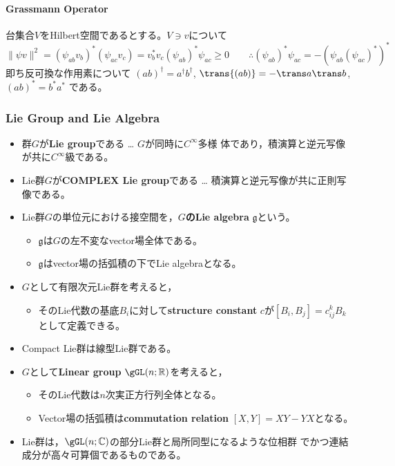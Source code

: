 \paragraph{Grassmann Operator}\mbox{}\par
台集合$V$をHilbert空間であるとする。$V\ni v$について
\begin{equation}
 \|\psi v\|^2=(\psi_{ab}v_b)^*(\psi_{ac}v_c) = v_b^*v_c(\psi_{ab})^*\psi_{ac}\ge 0
\qquad\therefore
(\psi_{ab})^*\psi_{ac}
 = -\left(\psi_{ab}(\psi_{ac})^*\right)^*
\end{equation}
即ち反可換な作用素について
$(ab)^\dagger = a^\dagger b^\dagger$,
$\trans{(ab)} = -\trans a \trans b$,
$(ab)^* = b^*a^*$ である。



\subsubsection{Lie Group and Lie Algebra}
\begin{itemize}
 \item 群$G$が{\bf Lie group}である … $G$が同時に$C^\infty$多様
       体であり，積演算と逆元写像が共に$C^\infty$級である。
 \item Lie群$G$が{\bf COMPLEX Lie group}である … 積演算と逆元写像が共に正則写像である。
\end{itemize}
\begin{itemize}
 \item Lie群$G$の単位元における接空間を，{\bf $G$のLie algebra}
       $\mathfrak g$という。
\begin{itemize}
 \item $\mathfrak g$は$G$の左不変なvector場全体である。
 \item $\mathfrak g$はvector場の括弧積の下でLie algebraとなる。
\end{itemize}
 \item $G$として有限次元Lie群を考えると，
\begin{itemize}
 \item そのLie代数の基底$B_i$に対して{\bf structure
       constant} $c$が$[B_i,B_j]=c^{k}_{ij}B_k$として定義できる。
\end{itemize}
\end{itemize}
\starline
\begin{itemize}
 \item Compact Lie群は線型Lie群である。
 \item $G$として{\bf Linear group} $\gGL(n;\Real)$を考えると，
 \begin{itemize}
  \item そのLie代数は$n$次実正方行列全体となる。
  \item Vector場の括弧積は{\bf commutation relation} $[X,Y]=XY-YX$となる。
 \end{itemize}
 \item Lie群は，$\gGL(n;\Complex)$の部分Lie群と局所同型になるような位相群
       でかつ連結成分が高々可算個であるものである。
\end{itemize}

